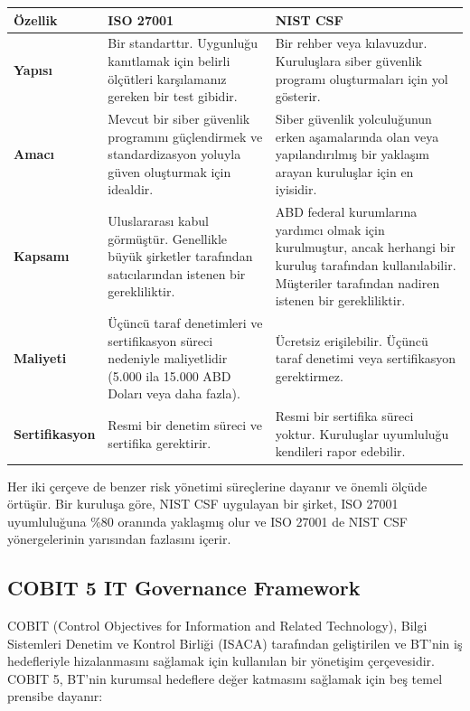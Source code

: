 \begin{center}
\begin{tabular}{|p{4cm}|p{6cm}|p{4cm}|}
\hline
\hline
\textbf{Özellik} & \textbf{ISO 27001} & \textbf{NIST CSF} \\
\hline
\hline
\textbf{Yapısı} & Bir standarttır. Uygunluğu kanıtlamak için belirli ölçütleri karşılamanız gereken bir test gibidir. & Bir rehber veya kılavuzdur. Kuruluşlara siber güvenlik programı oluşturmaları için yol gösterir. \\
\hline
\hline
\textbf{Amacı} & Mevcut bir siber güvenlik programını güçlendirmek ve standardizasyon yoluyla güven oluşturmak için idealdir. & Siber güvenlik yolculuğunun erken aşamalarında olan veya yapılandırılmış bir yaklaşım arayan kuruluşlar için en iyisidir. \\
\hline
\hline
\textbf{Kapsamı} & Uluslararası kabul görmüştür. Genellikle büyük şirketler tarafından satıcılarından istenen bir gerekliliktir. & ABD federal kurumlarına yardımcı olmak için kurulmuştur, ancak herhangi bir kuruluş tarafından kullanılabilir. Müşteriler tarafından nadiren istenen bir gerekliliktir. \\
\hline
\hline
\textbf{Maliyeti} & Üçüncü taraf denetimleri ve sertifikasyon süreci nedeniyle maliyetlidir (5.000 ila 15.000 ABD Doları veya daha fazla). & Ücretsiz erişilebilir. Üçüncü taraf denetimi veya sertifikasyon gerektirmez. \\
\hline
\hline
\textbf{Sertifikasyon} & Resmi bir denetim süreci ve sertifika gerektirir. & Resmi bir sertifika süreci yoktur. Kuruluşlar uyumluluğu kendileri rapor edebilir. \\
\hline
\hline
\hline
\end{tabular}
\end{center}

Her iki çerçeve de benzer risk yönetimi süreçlerine dayanır ve önemli ölçüde örtüşür. Bir kuruluşa göre, NIST CSF uygulayan bir şirket, ISO 27001 uyumluluğuna \%80 oranında yaklaşmış olur ve ISO 27001 de NIST CSF yönergelerinin yarısından fazlasını içerir.

\subsection{COBIT 5 IT Governance Framework}

COBIT (Control Objectives for Information and Related Technology), Bilgi Sistemleri Denetim ve Kontrol Birliği (ISACA) tarafından geliştirilen ve BT'nin iş hedefleriyle hizalanmasını sağlamak için kullanılan bir yönetişim çerçevesidir. COBIT 5, BT'nin kurumsal hedeflere değer katmasını sağlamak için beş temel prensibe dayanır:

